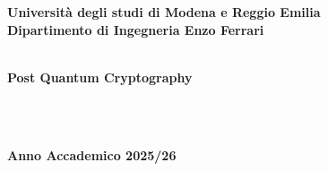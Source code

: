 \documentclass[12pt,a4paper,oneside,onecolumn,openright]{book}
\begin{document}
\begin{titlepage}
\begin{center}
{
    \large
    \textbf{Università  degli studi di Modena e Reggio Emilia} \\
   	\textbf{Dipartimento di Ingegneria Enzo Ferrari} \\
    \hspace*{0cm} \hrulefill \hspace*{0cm} \\
  
  
 		\huge{\bf Post Quantum Cryptography }}\\
		\vspace{3mm}
		
		\end{center}
		
\vspace{40mm}
\par
\noindent
\vspace{20mm}
\begin{center}
\hspace*{0cm} \hrulefill \hspace*{0cm} \\
{\large{\bf 
Anno Accademico 2025/26}}
\end{center}

\end{titlepage}

\pagestyle{frontmatter}
\frontmatter

\setcounter{tocdepth}{2}
\tableofcontents

\setlength{\parindent}{12pt}
\setlength{\parskip}{1ex plus 0.5ex minus 0.2ex}
\mainmatter
\pagestyle{mainmatter}









\begin{flushleft}

 
\end{flushleft}
\end{document}
